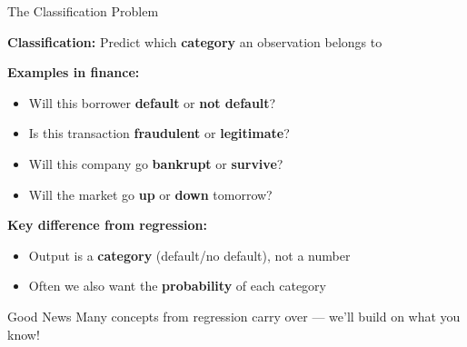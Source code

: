 \documentclass[10pt]{beamer}
\newcommand{\highlight}[1]{\textcolor{AccentOrange}{\textbf{#1}}}
\begin{document}
\begin{frame}{The Classification Problem}

  \textbf{Classification:} Predict which \highlight{category} an observation belongs to

  \vspace{1em}
  \textbf{Examples in finance:}
  \begin{itemize}
    \item Will this borrower \textbf{default} or \textbf{not default}?
    \item Is this transaction \textbf{fraudulent} or \textbf{legitimate}?
    \item Will this company go \textbf{bankrupt} or \textbf{survive}?
    \item Will the market go \textbf{up} or \textbf{down} tomorrow?
  \end{itemize}

  \vspace{1em}
  \textbf{Key difference from regression:}
  \begin{itemize}
    \item Output is a \highlight{category} (default/no default), not a number
    \item Often we also want the \highlight{probability} of each category
  \end{itemize}

  \vspace{0.5em}
  \begin{block}{Good News}
    Many concepts from regression carry over --- we'll build on what you know!
  \end{block}
\end{frame}

\end{document}
